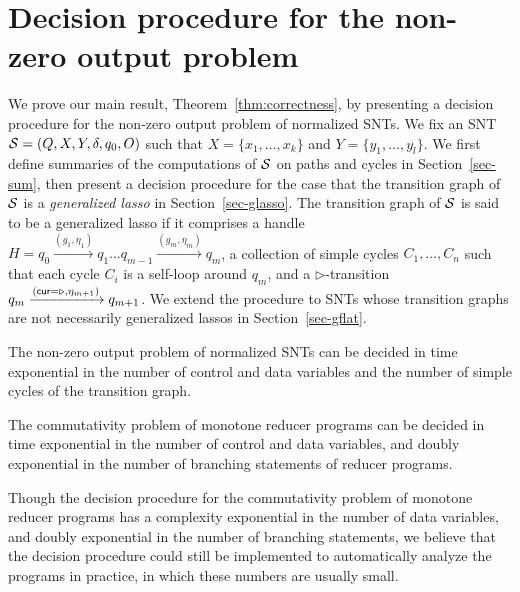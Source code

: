 
\section{Decision procedure for the non-zero output problem}\label{sec:dec-snt}
%
We prove our main result, Theorem~\ref{thm:correctness}, by presenting a decision procedure for the non-zero output problem of normalized SNTs. We fix an SNT ${\mathcal{S} } = (Q,X,Y,\delta,q_0,O)$ such that $X=\{ x_1,\dots, x_k\}$ and $Y = \{y_1,\dots,y_l\}$. 
We first define summaries of the computations of ${\mathcal{S} }$ on paths and cycles in Section~\ref{sec-sum}, then present a decision procedure for the case that the transition graph of ${\mathcal{S} }$ is a \emph{generalized lasso} in Section~\ref{sec-glasso}. The transition graph of ${\mathcal{S} }$ is said to be a generalized lasso if it comprises a handle $H=q_0 \xrightarrow{(g_1,\eta_1)} q_1 \dots q_{m-1} \xrightarrow{(g_m,\eta_m)} q_{m}$, a collection of simple cycles $C_1,\dots,C_n$ such that each cycle $C_i$ is a self-loop around $q_m$, and a $\triangleright$-transition $q_m \xrightarrow{(\mathsf{cur} = \triangleright, \eta_{m+1})} q_{m+1}$. We extend the procedure to SNTs whose transition graphs are not necessarily generalized lassos in Section~\ref{sec-gflat}. 


\begin{theorem}\label{thm:correctness}
The non-zero output problem of normalized SNTs can be decided in time exponential in the number of control and data variables and the number of simple cycles of the transition graph.
\end{theorem}

\begin{corollary}\label{cor:snt-dec-proc}
The commutativity problem of  monotone reducer programs can be decided in time exponential in the number of control and data variables, and doubly exponential in the number of branching statements of reducer programs. 
\end{corollary}

\begin{remark}
Though the decision procedure for the commutativity problem of monotone reducer programs has a complexity exponential in the number of data variables, and doubly exponential in the number of branching statements, we believe that the decision procedure could still be implemented to automatically analyze the programs in practice, in which these numbers are usually small. 
\end{remark}



